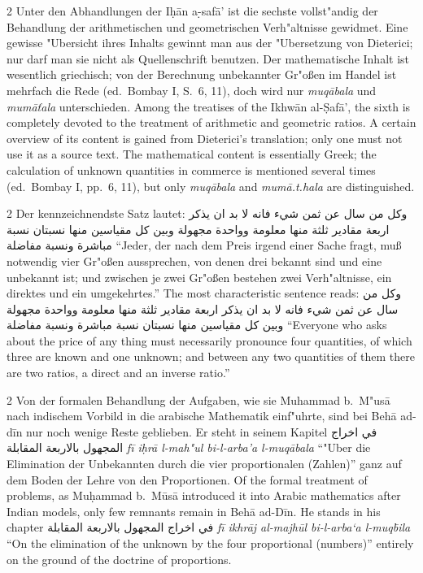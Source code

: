 \documentclass[10pt,a4paper]{article}
\renewcommand{\switchcolumn}{\syncronize\nointerlineskip\columnbreak}
\newcommand{\RL}[1]{\beginR#1\endR}
\newcommand{\ar}[1]{{\arabicfont\RL{#1}}}
\newcommand{\s}[1]{\d{#1}}
\newcommand{\hw}{\d{h}}
\newcommand{\enquote}[1]{``#1''}
\begin{document}
\begin{paracol}{2}
Unter den Abhandlungen der I\hw{}\=an a\s-s{}af\=a' ist die sechste vollst"andig der Behandlung der arithmetischen und geometrischen Verh"altnisse gewidmet. Eine gewisse "Ubersicht ihres Inhalts gewinnt man aus der "Ubersetzung von Dieterici; nur darf man sie nicht als Quellenschrift benutzen. Der mathematische Inhalt ist wesentlich griechisch; von der Berechnung unbekannter Gr"o\ss{}en im Handel ist mehrfach die Rede (ed.\ Bombay I, S.\ 6, 11), doch wird nur \textit{muq\=abala} und \textit{mum\=a\v{t}ala} unterschieden.
\switchcolumn
Among the treatises of the Ikhw\=an al-\d{S}af\=a', the sixth is completely devoted to the treatment of arithmetic and geometric ratios. A certain overview of its content is gained from Dieterici's translation; only one must not use it as a source text. The mathematical content is essentially Greek; the calculation of unknown quantities in commerce is mentioned several times (ed.\ Bombay I, pp.\ 6, 11), but only \textit{muq\=abala} and \textit{mum\=a.t.hala} are distinguished.
\end{paracol}

\begin{paracol}{2}
Der kennzeichnendste Satz lautet: \ar{وكل من سال عن ثمن شيء فانه لا بد ان يذكر اربعة مقادير ثلثة منها معلومة وواحدة مجهولة وبين كل مقياسين منها نسبتان نسبة مباشرة ونسبة مفاضلة} \enquote{Jeder, der nach dem Preis irgend einer Sache fragt, mu\ss{} notwendig vier Gr"o\ss{}en aussprechen, von denen drei bekannt sind und eine unbekannt ist; und zwischen je zwei Gr"o\ss{}en bestehen zwei Verh"altnisse, ein direktes und ein umgekehrtes.}
\switchcolumn
The most characteristic sentence reads: \ar{وكل من سال عن ثمن شيء فانه لا بد ان يذكر اربعة مقادير ثلثة منها معلومة وواحدة مجهولة وبين كل مقياسين منها نسبتان نسبة مباشرة ونسبة مفاضلة} ``Everyone who asks about the price of any thing must necessarily pronounce four quantities, of which three are known and one unknown; and between any two quantities of them there are two ratios, a direct and an inverse ratio.''
\end{paracol}

\begin{paracol}{2}
Von der formalen Behandlung der Aufgaben, wie sie Muhammad b.\ M"us\=a nach indischem Vorbild in die arabische Mathematik einf"uhrte, sind bei Beh\=a{} ad-d\={i}n nur noch wenige Reste geblieben. Er steht in seinem Kapitel \ar{في اخراج المجهول بالاربعة المقابلة} \textit{f\=i{} i\d{h}r\=a l-mah"ul bi-l-arba'a l-muq\=abala} \enquote{"Uber die Elimination der Unbekannten durch die vier proportionalen (Zahlen)} ganz auf dem Boden der Lehre von den Proportionen.
\switchcolumn
Of the formal treatment of problems, as Mu\d{h}ammad b.\ M\=us\=a introduced it into Arabic mathematics after Indian models, only few remnants remain in Beh\=a{} ad-D\={i}n. He stands in his chapter \ar{في اخراج المجهول بالاربعة المقابلة} \textit{f\={i} ikhr\=aj al-majh\=ul bi-l-arba`a l-muq\=bila} ``On the elimination of the unknown by the four proportional (numbers)'' entirely on the ground of the doctrine of proportions.
\end{paracol}
\end{document}
